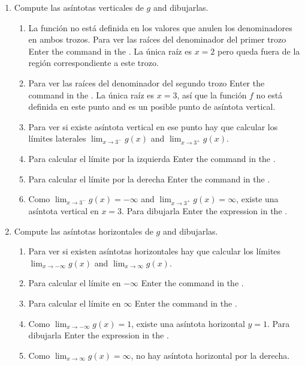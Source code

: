 \begin{enumerate}[leftmargin=*]
\begin{enumerate}
      \item Compute las asíntotas verticales de $g$ and dibujarlas.
            \begin{indication}
            \begin{enumerate}
            \item La función no está definida en los valores que anulen los denominadores en ambos trozos.
                  Para ver las raíces del denominador del primer trozo Enter the command  in the .
                  La única raíz es $x=2$ pero queda fuera de la región correspondiente a este trozo.
            \item Para ver las raíces del denominador del segundo trozo Enter the command  in the .
                  La única raíz es $x=3$, así que la función $f$ no está definida en este punto and es un posible punto de asíntota vertical.
            \item Para ver si existe asíntota vertical en ese punto hay que calcular los límites laterales $\lim_{x\rightarrow 3^-}g(x)$ and $\lim_{x\rightarrow 3^+}g(x)$.
            \item Para calcular el límite por la izquierda Enter the command  in the .
            \item Para calcular el límite por la derecha Enter the command  in the .
            \item Como $\lim_{x\rightarrow 3^-}g(x)=-\infty$ and $\lim_{x\rightarrow 3^+}g(x)=\infty$, existe una asíntota vertical en $x=3$.
                  Para dibujarla Enter the expression  in the .
            \end{enumerate}
            \end{indication}

      \item Compute las asíntotas horizontales de $g$ and dibujarlas.
            \begin{indication}
            \begin{enumerate}
            \item Para ver si existen asíntotas horizontales hay que calcular los límites $\lim_{x\rightarrow -\infty} g(x)$ and $\lim_{x\rightarrow \infty} g(x)$.
            \item Para calcular el límite en $-\infty$ Enter the command  in the .
            \item Para calcular el límite en $\infty$ Enter the command  in the .
            \item Como $\lim_{x\rightarrow -\infty} g(x)=1$, existe una asíntota horizontal $y=1$.
                  Para dibujarla Enter the expression  in the .
            \item Como $\lim_{x\rightarrow \infty} g(x)=\infty$, no hay asíntota horizontal por la derecha.
            \end{enumerate}
            \end{indication}


\end{enumerate}
\end{enumerate}
